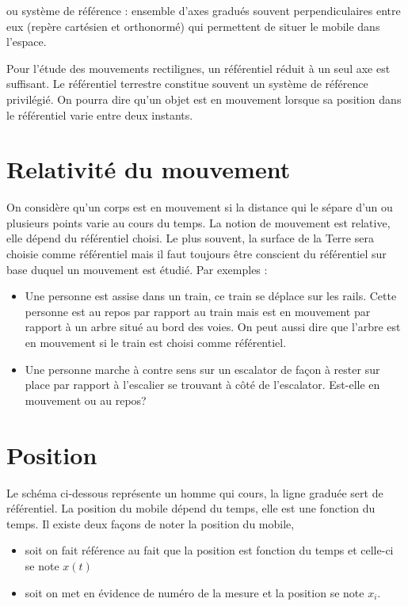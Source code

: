 \begin{encadre}
     ou système de référence : ensemble d'axes gradués souvent perpendiculaires entre eux (repère cartésien et orthonormé) qui permettent de situer le mobile dans l'espace.
\end{encadre}

Pour l'étude des mouvements rectilignes, un référentiel réduit à un seul axe est suffisant. Le référentiel terrestre constitue souvent un système de référence privilégié.
On pourra dire qu'un objet est en mouvement lorsque sa position dans le référentiel varie entre deux instants.

\section{Relativité du mouvement}
On considère qu'un corps est en mouvement si la distance qui le sépare d'un ou plusieurs points varie au cours du temps. La notion de mouvement est relative, elle dépend du référentiel choisi. Le plus souvent, la surface de la Terre sera choisie comme référentiel mais il faut toujours être conscient du référentiel sur base duquel un mouvement est étudié.
Par exemples :
\begin{itemize}[label= \textbullet]
    \item Une personne est assise dans un train, ce train se déplace sur les rails. Cette personne est au repos par rapport au train mais est en mouvement par rapport à un arbre situé au bord des voies. On peut aussi dire que l'arbre est en mouvement si le train est choisi comme référentiel.
    \item Une personne marche à contre sens sur un escalator de façon à rester sur place par rapport à l'escalier se trouvant à côté de l'escalator. Est-elle en mouvement ou au repos?
\end{itemize}

\newpage

\section{Position}
Le schéma ci-dessous représente un homme qui cours, la ligne graduée sert de référentiel. La position du mobile dépend du temps, elle est une fonction du temps. Il existe deux façons de noter la position du mobile,
\begin{itemize}[label= \textbullet]
    \item soit on fait référence au fait que la position est fonction du temps et celle-ci se note \(x(t)\)
    \item soit on met en évidence de numéro de la mesure et la position se note \(x_i\).
\end{itemize}

